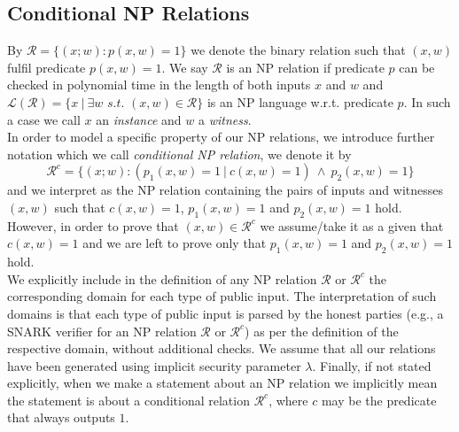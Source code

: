 \subsection{Conditional NP Relations}
\label{sec:conditional_relations}

\noindent By $\mathcal{R} =\{(x;w): p(x,w) = 1 \}$ we denote the binary relation such that $(x,w)$ 
fulfil predicate $p(x,w) = 1$. We say $\mathcal{R}$ is an NP relation if predicate $p$ can be checked in polynomial 
time in the length of both inputs $x$ and $w$ and $\mathcal{L}(\mathcal{R})= \{x \ | \ \exists w \textit{ s.t. } (x,w) \in \mathcal{R} \}$ 
is an NP language w.r.t. predicate $p$. In such a case we call $x$ an \emph{instance} and $w$ a \emph{witness}. \\

\noindent  In order to model a specific property of our NP relations, we introduce further notation which we call \emph{conditional NP relation}, we denote it by 
$$\mathcal{R}^c = \{(x;w) : (p_1(x,w) =1 \ | \ c(x,w) =1) \ \wedge \ p_2(x,w) = 1 \}$$ and we interpret as the NP relation containing the pairs of inputs and witnesses 
$(x,w)$ such that $c(x,w) =1$, $p_1(x,w) = 1$ and $p_2(x,w) =1$ hold. However, in order to prove that $(x,w) \in \mathcal{R}^c$ we assume/take it as a given that 
$c(x,w) =1$ and we are left to prove only that $p_1(x,w) = 1$ and $p_2(x,w) =1$ hold. \\


\noindent We explicitly include in the definition of any NP relation $\mathcal{R}$ or $\mathcal{R}^c$ the corresponding domain for each type 
of public input. The interpretation of such domains is that each type of public input is parsed by the honest parties (e.g., a SNARK verifier for an NP relation 
$\mathcal{R}$ or $\mathcal{R}^c$) as per the definition of the respective domain, without additional checks. We assume that all our relations have been 
generated using implicit security parameter $\lambda$. Finally, if not stated explicitly, when we make a statement about an NP relation we implicitly 
mean the statement is about a conditional relation $\mathcal{R}^c$, where $c$ may be the predicate that always outputs $1$. 

